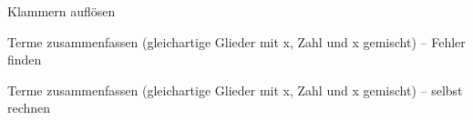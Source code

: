 \begin{aufgabe}{Klammern auflösen}
\end{aufgabe}

\begin{aufgabe}{Terme zusammenfassen (gleichartige Glieder mit x, Zahl und x gemischt) – Fehler finden}
\end{aufgabe}

\begin{aufgabe}{Terme zusammenfassen (gleichartige Glieder mit x, Zahl und x gemischt) – selbst rechnen}
\end{aufgabe}
